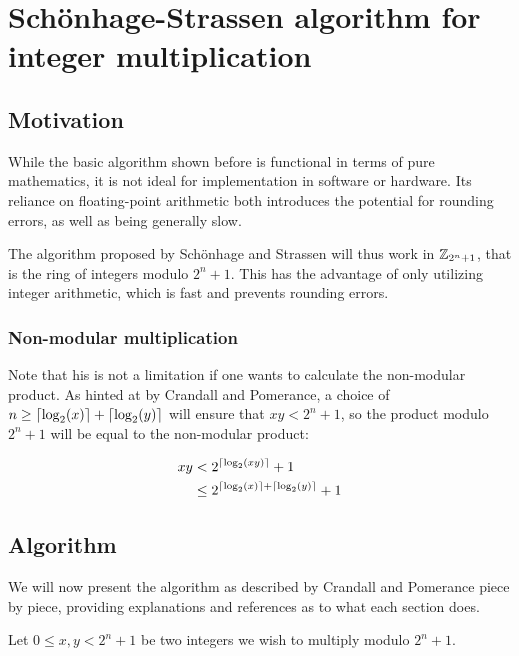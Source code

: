 \chapter{Schönhage-Strassen algorithm for integer multiplication}
\label{chapter:schoenhage_strassen}

\section{Motivation}

While the basic algorithm shown before is functional in terms of pure
mathematics, it is not ideal for implementation in software or hardware. Its
reliance on floating-point arithmetic both introduces the potential for
rounding errors, as well as being generally slow.

The algorithm proposed by Schönhage and Strassen will thus work in
$\mathbb{Z}_{2^n + 1}$, that is the ring of integers modulo $2^n + 1$. This has
the advantage of only utilizing integer arithmetic, which is fast and prevents
rounding errors.

\subsection{Non-modular multiplication}

Note that his is not a limitation if one wants to calculate the non-modular
product. As hinted at by Crandall and Pomerance,
\autocite{crandallPrimeNumbersComputational2005} a choice of $n \geq
\lceil\log_2(x)\rceil + \lceil\log_2(y)\rceil$ will ensure that $xy < 2^n + 1$, so the
product modulo $2^n + 1$ will be equal to the non-modular product:

\begin{align*}
		xy & < 2^{\lceil\log_2(xy)\rceil} + 1 \\
		   & \leq 2^{\lceil\log_2(x)\rceil + \lceil\log_2(y)\rceil} + 1
\end{align*}

\section{Algorithm}

We will now present the algorithm as described by Crandall and Pomerance
\autocite{crandallPrimeNumbersComputational2005} piece by piece, providing
explanations and references as to what each section does.

Let $0 \leq x, y < 2^n + 1$ be two integers we wish to multiply modulo $2^n +
1$.

